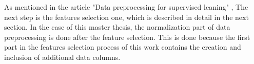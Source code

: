 \documentclass[../masterarbeit.tex]{subfiles}
\begin{document}
As mentioned in the article "Data preprocessing for supervised leaning" \textcite[]{kotsiantis2006data}, The next step is the features selection one, which is described in detail in the next section. 
In the case of this master thesis, the normalization part of data preprocessing is done after the feature selection. This is done because the first part in the features selection process of this work contains the creation and inclusion of additional data columns.
\end{document}
